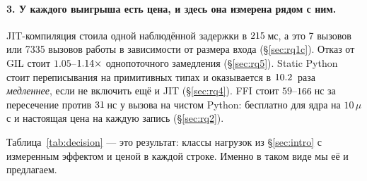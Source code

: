 \paragraph{3. У каждого выигрыша есть цена, и здесь она измерена рядом с ним.}
JIT-компиляция стоила одной наблюдённой задержки в $\meas{fact:b1_breakeven-314:facts.numba_compile_s:ms}{215}$\,мс, а это 7 вызовов или 7335 вызовов
работы в зависимости от размера входа (\S\ref{sec:rq1c}). Отказ от GIL стоит $1.05$--$\meas{ratio:b4_threads-ft:single_thread_arith/ft|b4_threads-gil:single_thread_arith/gil}{1.14}\times$
однопоточного замедления (\S\ref{sec:rq5}). Static Python стоит переписывания на
примитивных типах и оказывается в $\meas{ratio:b6_static-fork_static:matmul96_int/fork_static/static_interp|b6_static-fork_static:matmul96_int/fork_static/boxed_python}{10.2}$~раза \emph{медленнее}, если не включить ещё и JIT
(\S\ref{sec:rq4}). FFI стоит $59$--$\meas{med:b1_compute-314:call_overhead/c_ctypes:ns}{166}$\,нс за пересечение против $\meas{med:b1_compute-314:call_overhead/python_function:ns}{31}$\,нс у вызова на чистом
Python: бесплатно для ядра на $10\,\mu$с и настоящая цена на каждую запись (\S\ref{sec:rq2}).

\medskip
Таблица~\ref{tab:decision} --- это результат: классы нагрузок из \S\ref{sec:intro} с измеренным
эффектом и ценой в каждой строке. Именно в таком виде мы её и предлагаем.

